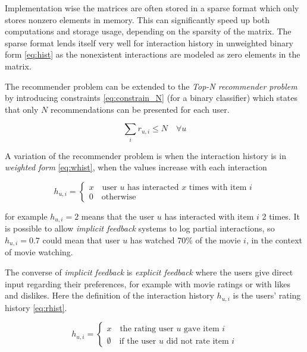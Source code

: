 Implementation wise the matrices are often stored in a sparse format which only stores nonzero elements in memory. This can significantly speed up both computations and storage usage, depending on the sparsity of the matrix. The sparse format lends itself very well for interaction history in unweighted binary form \eqref{eq:hist} as the nonexistent interactions are modeled as zero elements in the matrix.

The recommender problem can be extended to the \textit{Top-N recommender problem} by introducing constraints \eqref{eq:constrain_N} (for a binary classifier) which states that only $N$ recommendations can be presented for each user.

\begin{equation}\label{eq:constrain_N}
    \sum_i r_{u, i} \leq N \quad \forall u
\end{equation}

A variation of the recommender problem is when the interaction history is in \textit{weighted form} \eqref{eq:whist}, when the values increase with each interaction

\begin{equation}\label{eq:whist}
    h_{u, i} = \begin{cases}
        x \quad \text{user $u$ has interacted $x$ times with item $i$} \\
        0 \quad \text{otherwise}
    \end{cases}
\end{equation}

for example $h_{u, i} = 2$ means that the user $u$ has interacted with item $i$ 2 times. It is possible to allow \textit{implicit feedback} systems to log partial interactions, so $h_{u, i} = 0.7$ could mean that user $u$ has watched 70\% of the movie $i$, in the context of movie watching. \citep{hu2008collaborative}

The converse of \textit{implicit feedback} is \textit{explicit feedback} where the users give direct input regarding their preferences, for example with movie ratings or with likes and dislikes.  Here the definition of the interaction history $h_{u, i}$ is the users' rating history \eqref{eq:rhist}.

\begin{equation}\label{eq:rhist}
    h_{u, i} = \begin{cases}
        x \quad \text{the rating user $u$ gave item $i$} \\
        \emptyset \quad \text{if the user $u$ did not rate item $i$}
    \end{cases}
\end{equation}

